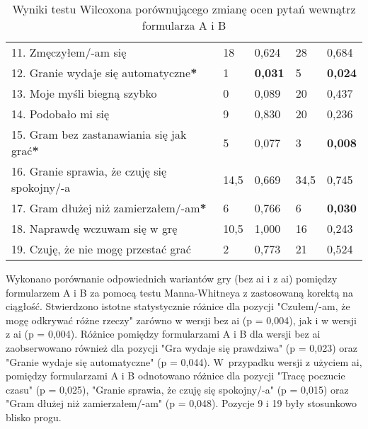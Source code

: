 \begin{table}[!h]
\begin{center}
\begin{tabular}{|m{12em}|m{5em}|m{4em}|m{5em}|m{4em}|}
            11. Zmęczyłem/-am się                                             & 18                     & 0,624          & 28                     & 0,684          \\
            12. Granie wydaje się automatyczne\textbf{*}                      & 1                      & \textbf{0,031} & 5                      & \textbf{0,024} \\
            13. Moje myśli \newline biegną szybko                             & 0                      & 0,089          & 20                     & 0,437          \\
            14. Podobało mi się                                               & 9                      & 0,830          & 20                     & 0,236          \\
            15. Gram bez zastanawiania się jak grać\textbf{*}                 & 5                      & 0,077          & 3                      & \textbf{0,008} \\
            16. Granie sprawia, \newline że czuję się spokojny/-a             & 14,5                   & 0,669          & 34,5                   & 0,745          \\
            17. Gram dłużej \newline niż zamierzałem/-am\textbf{*}            & 6                      & 0,766          & 6                      & \textbf{0,030} \\
            18. Naprawdę wczuwam się w grę                                    & 10,5                   & 1,000          & 16                     & 0,243          \\
            19. Czuję, że nie mogę przestać grać                              & 2                      & 0,773          & 21                     & 0,524          \\
            \hline
        \end{tabular}
    \end{center}
    \caption{Wyniki testu Wilcoxona porównującego zmianę ocen pytań wewnątrz formularza A i B}\label{tab1:ch7_13}
\end{table}

\newpage

Wykonano porównanie odpowiednich wariantów gry (bez \gls{ai} i z \gls{ai}) pomiędzy formularzem A i B za pomocą testu
Manna-Whitneya z zastosowaną korektą na ciągłość. Stwierdzono istotne statystycznie różnice dla pozycji "Czułem/-am, że mogę odkrywać różne rzeczy"
zarówno w wersji bez \gls{ai} (p = 0,004), jak i w wersji z \gls{ai} (p = 0,004). Różnice pomiędzy formularzami
A i B dla wersji bez \gls{ai} zaobserwowano również dla pozycji "Gra wydaje się prawdziwa" (p = 0,023) oraz "Granie wydaje
się automatyczne" (p = 0,044). W~przypadku wersji z użyciem \gls{ai}, pomiędzy formularzami A i B odnotowano różnice dla
pozycji "Tracę poczucie czasu" (p = 0,025), "Granie sprawia, że czuję się spokojny/-a" (p = 0,015) oraz "Gram
dłużej niż zamierzałem/-am" (p = 0,048). Pozycje 9 i 19 były stosunkowo blisko progu.


